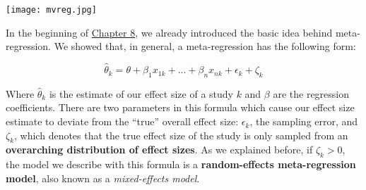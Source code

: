 \documentclass[]{book}
\begin{document}
\texttt{[image: mvreg.jpg]}

In the beginning of \protect\hyperlink{metareg}{Chapter 8}, we already introduced the basic idea behind meta-regression. We showed that, in general, a meta-regression has the following form:

\[\hat \theta_k = \theta + \beta_1x_{1k} + ... + \beta_nx_{nk} + \epsilon_k + \zeta_k\]

Where \(\hat \theta_k\) is the estimate of our effect size of a study \(k\) and \(\beta\) are the regression coefficients. There are two parameters in this formula which cause our effect size estimate to deviate from the ``true'' overall effect size: \(\epsilon_k\), the sampling error, and \(\zeta_k\), which denotes that the true effect size of the study is only sampled from an \textbf{overarching distribution of effect sizes}. As we explained before, if \(\zeta_k>0\), the model we describe with this formula is a \textbf{random-effects meta-regression model}, also known as a \emph{mixed-effects model}.
\end{document}
